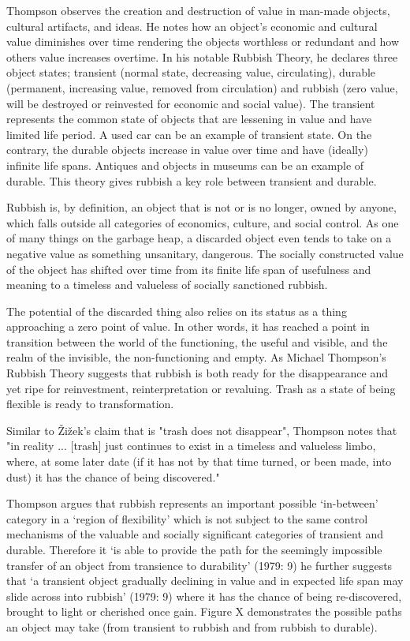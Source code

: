 Thompson observes the creation and destruction of value in man-made objects, cultural artifacts, and ideas. He notes how an object’s economic and cultural value diminishes over time rendering the objects worthless or redundant and how others value increases overtime. In his notable Rubbish Theory, he declares three object states; transient (normal state, decreasing value, circulating), durable (permanent, increasing value, removed from circulation) and rubbish (zero value, will be destroyed or reinvested for economic and social value). The transient represents the common state of objects that are lessening in value and have limited life period. A used car can be an example of transient state. On the contrary, the durable objects increase in value over time and have (ideally) infinite life spans. Antiques and objects in museums can be an example of durable. This theory gives rubbish a key role between transient and durable. 

Rubbish is, by definition, an object that is not or is no longer, owned by anyone, which falls outside all categories of economics, culture, and social control. As one of many things on the garbage heap, a discarded object even tends to take on a negative value as something unsanitary, dangerous. The socially constructed value of the object has shifted over time from its finite life span of usefulness and meaning to a timeless and valueless of socially sanctioned rubbish. 

The potential of the discarded thing also relies on its status as a thing approaching a zero point of value. In other words, it has reached a point in transition between the world of the functioning, the useful and visible, and the realm of the invisible, the non-functioning and empty. As Michael Thompson’s Rubbish Theory suggests that rubbish is both ready for the disappearance and yet ripe for reinvestment, reinterpretation or revaluing. Trash as a state of being flexible is ready to transformation.

Similar to Žižek's claim that is "trash does not disappear", Thompson notes that "in reality ... [trash] just continues to exist in a timeless and valueless limbo, where, at some later date (if it has not by that time turned, or been made, into dust) it has the chance of being discovered."

Thompson argues that rubbish represents an important possible ‘in-between’ category in a ‘region of flexibility’ which is not subject to the same control mechanisms of the valuable and socially significant categories of transient and durable. Therefore it ‘is able to provide the path for the seemingly impossible transfer of an object from transience to durability’ (1979: 9) he further suggests that ‘a transient object gradually declining in value and in expected life span may slide across into rubbish’ (1979: 9) where it has the chance of being re-discovered, brought to light or cherished once gain. Figure X demonstrates the possible paths an object may take (from transient to rubbish and from rubbish to durable).

